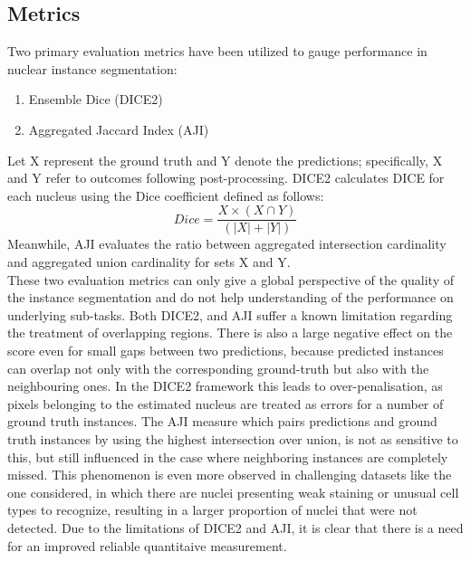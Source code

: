 \documentclass[target=bach,aauheader=,style=]{thud}
\begin{document}
\subsection{Metrics}
\label{sec:metrics}
Two primary evaluation metrics have been utilized to gauge performance in nuclear instance segmentation:
\begin{enumerate}
    \item Ensemble Dice (DICE2) \cite{vu2019methods}
    \item Aggregated Jaccard Index (AJI) \cite{kumar2017dataset}
\end{enumerate}
Let X represent the ground truth and Y denote the predictions; specifically, X and Y refer to outcomes following post-processing. DICE2 calculates DICE for each nucleus using the Dice coefficient defined as follows:
\begin{equation}
    Dice = \frac{X\times(X\cap Y)}{(|X|+|Y|)}
\end{equation}
Meanwhile, AJI evaluates the ratio between aggregated intersection cardinality and aggregated union cardinality for sets X and Y.\\
These two evaluation metrics can only give a global perspective of the quality of the instance segmentation and do not help understanding of the performance on underlying sub-tasks.
Both DICE2, and AJI suffer a known limitation regarding the treatment of overlapping regions.
There is also a large negative effect on the score even for small gaps between two predictions, because predicted instances can overlap not only with the corresponding ground-truth but also with the neighbouring ones.
In the DICE2 framework this leads to over-penalisation, as pixels belonging to the estimated nucleus are treated as errors for a number of ground truth instances.
The AJI measure which pairs predictions and ground truth instances by using the highest intersection over union, is not as sensitive to this, but still influenced in the case where neighboring instances are completely missed.
This phenomenon is even more observed in challenging datasets like the one considered, in which there are nuclei presenting weak staining or unusual cell types to recognize, resulting in a larger proportion of nuclei that were not detected.
Due to the limitations of DICE2 and AJI, it is clear that there is a need for an improved reliable quantitaive measurement.\\
\end{document}
